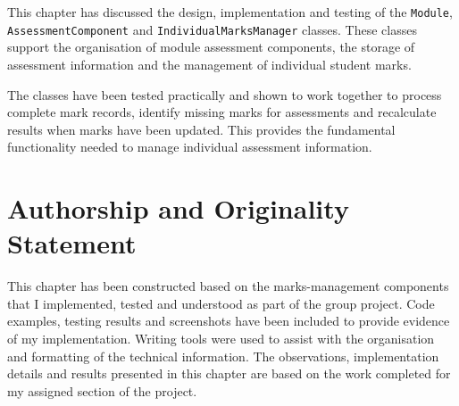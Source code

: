 This chapter has discussed the design, implementation and testing of the \texttt{Module}, \texttt{AssessmentComponent} and \texttt{IndividualMarksManager} classes. These classes support the organisation of module assessment components, the storage of assessment information and the management of individual student marks.

The classes have been tested practically and shown to work together to process complete mark records, identify missing marks for assessments and recalculate results when marks have been updated. This provides the fundamental functionality needed to manage individual assessment information.

\section{Authorship and Originality Statement}

This chapter has been constructed based on the marks-management components that I implemented, tested and understood as part of the group project. Code examples, testing results and screenshots have been included to provide evidence of my implementation. Writing tools were used to assist with the organisation and formatting of the technical information. The observations, implementation details and results presented in this chapter are based on the work completed for my assigned section of the project.
